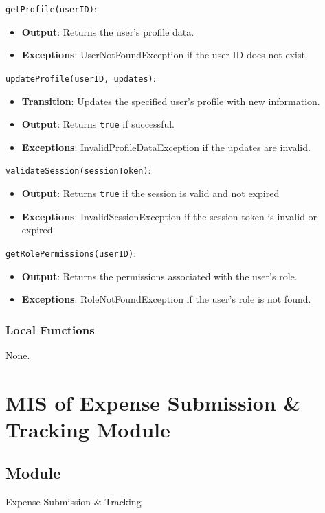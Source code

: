 \documentclass[12pt, titlepage]{article}
\begin{document}
\noindent \texttt{getProfile(userID)}:
\begin{itemize}
    \item \textbf{Output}: Returns the user's profile data.
    \item \textbf{Exceptions}: UserNotFoundException if the user ID does not exist.
\end{itemize}

\noindent \texttt{updateProfile(userID, updates)}:
\begin{itemize}
    \item \textbf{Transition}: Updates the specified user's profile with new information.
    \item \textbf{Output}: Returns \texttt{true} if successful.
    \item \textbf{Exceptions}: InvalidProfileDataException if the updates are invalid.
\end{itemize}

\noindent \texttt{validateSession(sessionToken)}:
\begin{itemize}
    \item \textbf{Output}: Returns \texttt{true} if the session is valid and not expired
    \item \textbf{Exceptions}: InvalidSessionException if the session token is invalid or expired.
\end{itemize}

\noindent \texttt{getRolePermissions(userID)}:
\begin{itemize}
    \item \textbf{Output}: Returns the permissions associated with the user's role.
    \item \textbf{Exceptions}: RoleNotFoundException if the user's role is not found.
\end{itemize}

\subsubsection{Local Functions}
None.

\section{MIS of Expense Submission \& Tracking Module}
\subsection{Module}
Expense Submission \& Tracking
\end{document}

